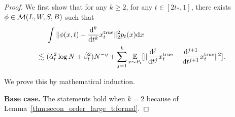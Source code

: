 \begin{proof}
    We first show that for any $k \geq 2$, for any $t \in [2t_*,1]$, there exists $\phi \in {\cal M}(L,W,S,B)$ such that
    \begin{align}
    \label{eq:tmp_3_large}
    &~ \int \|\phi(x, t) - \frac{\mathrm{d}^k}{\mathrm{d} t^k}{x}_t^\mathrm{true}\|^2_2 p_t(x) \mathrm{d} x \notag \\
    \lesssim &~ 
    (\dot{\alpha}_t^{2} \log N  +   \dot{\beta}_t^{2} ) N^{-\eta} +
    \sum_{j=1}^{k}\operatorname*{{\mathbb{E}}}_{x \sim P_t}[\|\frac{\mathrm{d}^{j}}{\mathrm{d} t^{j}}x_t^\mathrm{true} - \frac{\mathrm{d}^{j+1}}{\mathrm{d} t^{j+1}}x_t^\mathrm{true}\|^2].
    \end{align}

    We prove this by mathematical induction.

    \textbf{Base case.} The statements hold when $k = 2$ because of Lemma~\ref{thm:secon_order_large_t:formal}.


\end{proof}
